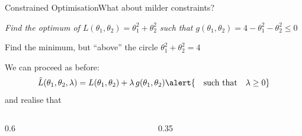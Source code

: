 \begin{frame}{Constrained Optimisation}{What about milder constraints?}
    \begin{center}
        \emph{%
            Find the optimum of $L(\theta_1, \theta_2) = \theta_1^2 + \theta_2^2$ such that $g(\theta_1, \theta_2) = 4 - \theta_1^2 - \theta_2^2 \le 0$
        }

        {\tiny Find the minimum, but \enquote{above} the circle $\theta_1^2 + \theta_2^2 = 4$}
    \end{center}

    \vfill \pause

    We can proceed as before:
    \begin{equation*}
        \tilde{L}(\theta_1, \theta_2, \lambda)
        =
        L(\theta_1, \theta_2) + \lambda\, g(\theta_1, \theta_2)
        \alert{\quad \text{such that} \quad \lambda \ge 0}
    \end{equation*}
    and realise that
    \begin{columns}[c]
        \begin{column}{0.6\textwidth}
        \end{column}
        \hfil
        \begin{column}{0.35\textwidth}
            \centering
            
        \end{column}
    \end{columns}
\end{frame}

